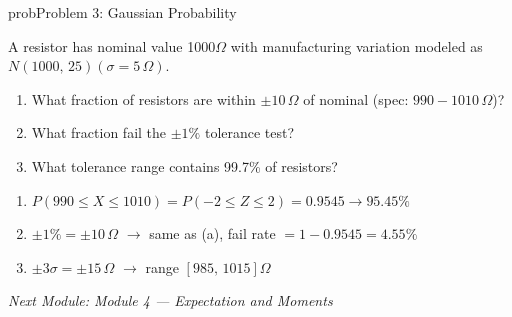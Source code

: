 \begin{PSbox}[unbreakable]{prob}{Problem 3: Gaussian Probability}

A resistor has nominal value 1000\ensuremath{\Omega} with manufacturing variation modeled as $N(1000,\, 25) (\sigma = 5\,\Omega)$.

\begin{enumerate}
\def\labelenumi{(\alph{enumi})}
\tightlist
\item
  What fraction of resistors are within $\pm 10\,\Omega$ of nominal (spec: $990-1010\,\Omega$)?
\item
  What fraction fail the $\pm 1\%$ tolerance test?
\item
  What tolerance range contains 99.7\% of resistors?
\end{enumerate}

\PSsolution{} 

\begin{enumerate}
\def\labelenumi{(\alph{enumi})}
\tightlist
\item
  $P(990 \le X \le 1010) = P(-2 \le Z \le 2) = 0.9545 \to 95.45\%$
\item
  $\pm 1\% = \pm 10\,\Omega$ \ensuremath{\to} same as (a), fail rate $= 1 - 0.9545 = 4.55\%$
\item
  $\pm 3\sigma = \pm 15\,\Omega$ \ensuremath{\to} range $[985,\, 1015]\Omega$
\end{enumerate}

\emph{Next Module: {Module 4 — Expectation and Moments}}

\end{PSbox}
